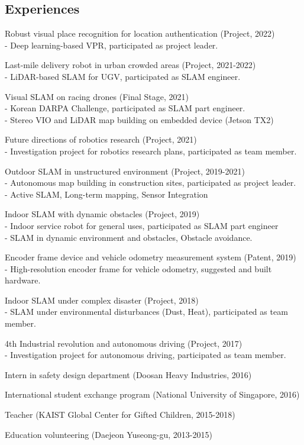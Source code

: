 \documentclass[margin]{res}
\begin{document}
\begin{resume}
		\section{Experiences}
		\par	Robust visual place recognition for location authentication (Project, 2022) 
		\\-	Deep learning-based VPR, participated as project leader.
		\par	Last-mile delivery robot in urban crowded areas (Project, 2021-2022) 
		\\-	LiDAR-based SLAM for UGV, participated as SLAM engineer.
		\par	Visual SLAM on racing drones (Final Stage, 2021)
		\\-	Korean DARPA Challenge, participated as SLAM part engineer.
		\\-	Stereo VIO and LiDAR map building on embedded device (Jetson TX2)
		\par	Future directions of robotics research (Project, 2021)
		\\-	Investigation project for robotics research plans, participated as team member.
		\par	Outdoor SLAM in unstructured environment (Project, 2019-2021)
		\\-	Autonomous map building in construction sites, participated as project leader.
		\\-	Active SLAM, Long-term mapping, Sensor Integration
		\par	Indoor SLAM with dynamic obstacles (Project, 2019)
		\\-	Indoor service robot for general uses, participated as SLAM part engineer
		\\-	SLAM in dynamic environment and obstacles, Obstacle avoidance.
		\par	Encoder frame device and vehicle odometry measurement system (Patent, 2019)
		\\-	High-resolution encoder frame for vehicle odometry, suggested and built hardware.
		\par	Indoor SLAM under complex disaster (Project, 2018)
		\\-	SLAM under environmental disturbances (Dust, Heat), participated as team member.
		\par	4th Industrial revolution and autonomous driving (Project, 2017)
		\\-	Investigation project for autonomous driving, participated as team member.
		\par	Intern in safety design department (Doosan Heavy Industries, 2016)
		\par	International student exchange program (National University of Singapore, 2016)
		\par	Teacher (KAIST Global Center for Gifted Children, 2015-2018)
		\par	Education volunteering (Daejeon Yuseong-gu, 2013-2015)
		

\end{resume}
\end{document}
